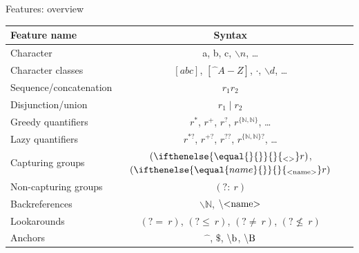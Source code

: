 \documentclass[aspectratio=169]{beamer}
\newcommand{\charclass}[1]{[#1]}
\newcommand{\ncharclass}[1]{\charclass{\widehat{\phantom{x}}#1}}
\newcommand{\dotc}[0]{{\cdot{}}}
\newcommand{\escaped}[1]{\backslash{}#1}
\newcommand{\disj}[0]{\mathbin{|}}
\renewcommand{\star}[0]{^{*}}
\newcommand{\plus}[0]{^{+}}
\newcommand{\question}[0]{^{?}}
\newcommand{\rrep}[2]{^{\{#1,#2\}}}
\newcommand{\lstar}[0]{^{*?}}
\newcommand{\lplus}[0]{^{+?}}
\newcommand{\lquestion}[0]{^{??}}
\newcommand{\lrrep}[2]{^{\{#1,#2\}?}}
\newcommand{\pgroup}[1]{({?}{:}\ #1)}
\newcommand{\group}[2][]{(\ifthenelse{\equal{#1}{}}{}{_{\textup{\scriptsize<#1>}}}#2)}
\newcommand{\mstart}[0]{\widehat{\phantom{x}}}
\newcommand{\mend}[0]{\mathdollar}
\newcommand{\wboundary}[0]{\escaped{\textup{b}}}
\newcommand{\wBoundary}[0]{\escaped{\textup{B}}}
\newcommand{\lookahead}[1]{({?}{=}\ #1)}
\newcommand{\lookbehind}[1]{({?}{\leq}\ #1)}
\newcommand{\neglookahead}[1]{({?}{\not=}\ #1)}
\newcommand{\neglookbehind}[1]{({?}{\not\leq}\ #1)}
\newcommand{\nbackref}[1]{\escaped{\textup{<#1>}}}
\begin{document}
    \begin{frame}{Features: overview}
        \begin{center}
            \begin{tabular}{lcc}
                Feature name & Syntax \\ \toprule
                Character & a, b, c, $\escaped{n}$, \ldots \\
                Character classes & $\charclass{abc}$, $\ncharclass{A-Z}$, $\dotc{}$, $\escaped{d}$, \ldots \\
                Sequence/concatenation & $r_1 r_2$ \\
                Disjunction/union & $r_1 \disj{} r_2$ \\
                Greedy quantifiers & $r\star{}$, $r\plus{}$, $r\question{}$, $r\rrep{\mathbb{N}}{\mathbb{N}}$, \ldots \\
                Lazy quantifiers & $r\lstar{}$, $r\lplus{}$, $r\lquestion{}$, $r\lrrep{\mathbb{N}}{\mathbb{N}}$, \ldots \\
                Capturing groups & $\group{r}$, $\group[name]{r}$ \\
                Non-capturing groups & $\pgroup{r}$ \\
                Backreferences & $\escaped{\mathbb{N}}$, $\nbackref{name}$ \\
                Lookarounds & $\lookahead{r}$, $\lookbehind{r}$, $\neglookahead{r}$, $\neglookbehind{r}$ \\
                Anchors & $\mstart{}$, $\mend{}$, $\wboundary{}$, $\wBoundary{}$
            \end{tabular}\\[0.4em]
        \end{center}
    \end{frame}
\end{document}
